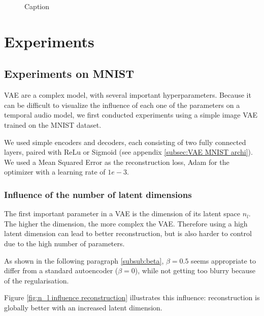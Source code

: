 \documentclass{article}
\begin{document}
\begin{figure}[ht]
    \centering
    
    \caption{Caption}
    \label{fig:enter-label}
\end{figure}


\section{Experiments}
\subsection{Experiments on MNIST}

VAE are a complex model, with several important hyperparameters. Because it can be difficult to visualize the influence of each one of the parameters on a temporal audio model, we first conducted experiments using a simple image VAE trained on the MNIST dataset.

We used simple encoders and decoders, each consisting of two fully connected layers, paired with ReLu or Sigmoid (see appendix \ref{subsec:VAE MNIST archi}). We used a Mean Squared Error as the reconstruction loss, Adam for the optimizer with a learning rate of $1e-3$.

\subsubsection{Influence of the number of latent dimensions}

The first important parameter in a VAE is the dimension of its latent space $n_{l}$.
The higher the dimension, the more complex the VAE. Therefore using a high latent dimension can lead to better reconstruction, but is also harder to control due to the high number of parameters.

As shown in the following paragraph \ref{subsub:beta}, $\beta = 0.5$ seems appropriate to differ from a standard autoencoder ($\beta=0$), while not getting too blurry because of the regularisation.

Figure \ref{fig:n_l influence reconstruction} illustrates this influence: reconstruction is globally better with an increased latent dimension. %
\end{document}
